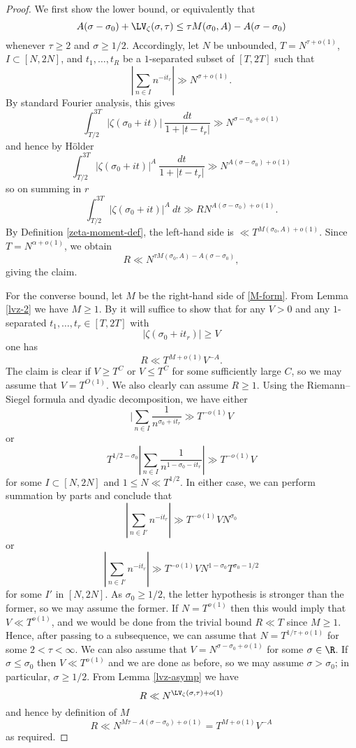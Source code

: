 \begin{proof}  We first show the lower bound, or equivalently that
$$ A(\sigma-\sigma_0) + \LV_\zeta(\sigma,\tau) \leq \tau M(\sigma_0,A) - A(\sigma-\sigma_0)$$
whenever $\tau \geq 2$ and $\sigma \geq 1/2$.  Accordingly, let $N$ be unbounded, $T = N^{\tau+o(1)}$, $I \subset [N,2N]$, and $t_1,\dots,t_R$ be a $1$-separated subset of $[T,2T]$ such that
$$ |\sum_{n \in I} n^{-it_r}| \gg N^{\sigma+o(1)}.$$
By standard Fourier analysis, this gives
$$ \int_{T/2}^{3T} |\zeta(\sigma_0+it)|\ \frac{dt}{1+|t-t_r|} \gg N^{\sigma - \sigma_0 + o(1)}$$
and hence by H\"older
$$ \int_{T/2}^{3T} |\zeta(\sigma_0+it)|^A\ \frac{dt}{1+|t-t_r|} \gg N^{A(\sigma - \sigma_0) + o(1)}$$
so on summing in $r$
$$ \int_{T/2}^{3T} |\zeta(\sigma_0+it)|^A\ dt \gg R N^{A(\sigma - \sigma_0) + o(1)}.$$
By Definition \ref{zeta-moment-def}, the left-hand side is $\ll T^{M(\sigma_0,A)+o(1)}$.  Since $T = N^{\alpha+o(1)}$, we obtain
$$ R \ll N^{\tau M(\sigma_0,A) - A(\sigma-\sigma_0)},$$
giving the claim.

For the converse bound, let $M$ be the right-hand side of \eqref{M-form}.  From Lemma \ref{lvz-2} we have $M \geq 1$. By \cite[\S 8.1]{ivic} it will suffice to show that for any $V>0$ and any $1$-separated $t_1,\dots,t_r \in [T,2T]$ with 
$$ |\zeta(\sigma_0+it_r)| \geq V$$
one has
$$ R \ll T^{M+o(1)} V^{-A}.$$
The claim is clear if $V \geq T^C$ or $V \leq T^C$ for some sufficiently large $C$, so we may assume that $V = T^{O(1)}$.  We also clearly can assume $R \geq 1$.  Using the Riemann--Siegel formula and dyadic decomposition, we have either
$$ |\sum_{n \in I} \frac{1}{n^{\sigma_0+it_r}} \gg T^{-o(1)} V$$
or
$$ T^{1/2-\sigma_0} |\sum_{n \in I} \frac{1}{n^{1-\sigma_0-it_r}}| \gg T^{-o(1)} V$$
for some $I \subset [N,2N]$ and $1 \leq N \ll T^{1/2}$.  In either case, we can perform summation by parts and conclude that
$$ |\sum_{n \in I'} n^{-it_r}|\gg T^{-o(1)} V N^{\sigma_0}$$
or
$$ |\sum_{n \in I'} n^{-it_r}|\gg T^{-o(1)} V N^{1-\sigma_0} T^{\sigma_0-1/2}$$
for some $I'$ in $[N,2N]$.  As $\sigma_0 \geq 1/2$, the letter hypothesis is stronger than the former, so we may assume the former.  If $N = T^{o(1)}$ then this would imply that $V \ll T^{o(1)}$, and we would be done from the trivial bound $R \ll T$ since $M \geq 1$.
Hence, after passing to a subsequence, we can assume that $N = T^{1/\tau+o(1)}$ for some $2 < \tau < \infty$.  We can also assume that $V = N^{\sigma-\sigma_0+o(1)}$ for some $\sigma \in \R$. If $\sigma \leq \sigma_0$ then $V \ll T^{o(1)}$ and we are done as before, so we may assume $\sigma > \sigma_0$; in particular, $\sigma \geq 1/2$.  From Lemma \ref{lvz-asymp} we have
$$ R \ll N^{\LV_\zeta(\sigma,\tau)+o(1)}$$
and hence by definition of $M$
$$ R \ll N^{M \tau - A (\sigma-\sigma_0)+o(1)} = T^{M+o(1)} V^{-A}$$
as required.
\end{proof}

